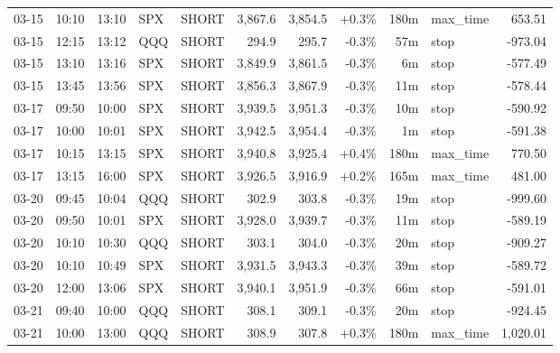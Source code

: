 \documentclass[11pt,a4paper,twoside]{article}
\begin{document}
\begin{center}
\begin{longtable}{>{\color{txtmain}}l l l l l r r r r >{\color{txtmain}}l r}
03-15 & 10:10 & 13:10 & SPX & SHORT & 3,867.6 & 3,854.5 & \textcolor{wingreen}{+0.3\%} & 180m & max\_time & \textcolor{wingreen}{653.51} \\
03-15 & 12:15 & 13:12 & QQQ & SHORT & 294.9 & 295.7 & \textcolor{lossred}{-0.3\%} & 57m & stop & \textcolor{lossred}{-973.04} \\
03-15 & 13:10 & 13:16 & SPX & SHORT & 3,849.9 & 3,861.5 & \textcolor{lossred}{-0.3\%} & 6m & stop & \textcolor{lossred}{-577.49} \\
03-15 & 13:45 & 13:56 & SPX & SHORT & 3,856.3 & 3,867.9 & \textcolor{lossred}{-0.3\%} & 11m & stop & \textcolor{lossred}{-578.44} \\
03-17 & 09:50 & 10:00 & SPX & SHORT & 3,939.5 & 3,951.3 & \textcolor{lossred}{-0.3\%} & 10m & stop & \textcolor{lossred}{-590.92} \\
03-17 & 10:00 & 10:01 & SPX & SHORT & 3,942.5 & 3,954.4 & \textcolor{lossred}{-0.3\%} & 1m & stop & \textcolor{lossred}{-591.38} \\
03-17 & 10:15 & 13:15 & SPX & SHORT & 3,940.8 & 3,925.4 & \textcolor{wingreen}{+0.4\%} & 180m & max\_time & \textcolor{wingreen}{770.50} \\
03-17 & 13:15 & 16:00 & SPX & SHORT & 3,926.5 & 3,916.9 & \textcolor{wingreen}{+0.2\%} & 165m & max\_time & \textcolor{wingreen}{481.00} \\
03-20 & 09:45 & 10:04 & QQQ & SHORT & 302.9 & 303.8 & \textcolor{lossred}{-0.3\%} & 19m & stop & \textcolor{lossred}{-999.60} \\
03-20 & 09:50 & 10:01 & SPX & SHORT & 3,928.0 & 3,939.7 & \textcolor{lossred}{-0.3\%} & 11m & stop & \textcolor{lossred}{-589.19} \\
03-20 & 10:10 & 10:30 & QQQ & SHORT & 303.1 & 304.0 & \textcolor{lossred}{-0.3\%} & 20m & stop & \textcolor{lossred}{-909.27} \\
03-20 & 10:10 & 10:49 & SPX & SHORT & 3,931.5 & 3,943.3 & \textcolor{lossred}{-0.3\%} & 39m & stop & \textcolor{lossred}{-589.72} \\
03-20 & 12:00 & 13:06 & SPX & SHORT & 3,940.1 & 3,951.9 & \textcolor{lossred}{-0.3\%} & 66m & stop & \textcolor{lossred}{-591.01} \\
03-21 & 09:40 & 10:00 & QQQ & SHORT & 308.1 & 309.1 & \textcolor{lossred}{-0.3\%} & 20m & stop & \textcolor{lossred}{-924.45} \\
03-21 & 10:00 & 13:00 & QQQ & SHORT & 308.9 & 307.8 & \textcolor{wingreen}{+0.3\%} & 180m & max\_time & \textcolor{wingreen}{1,020.01} \\

\end{longtable}
\end{center}
\end{document}
